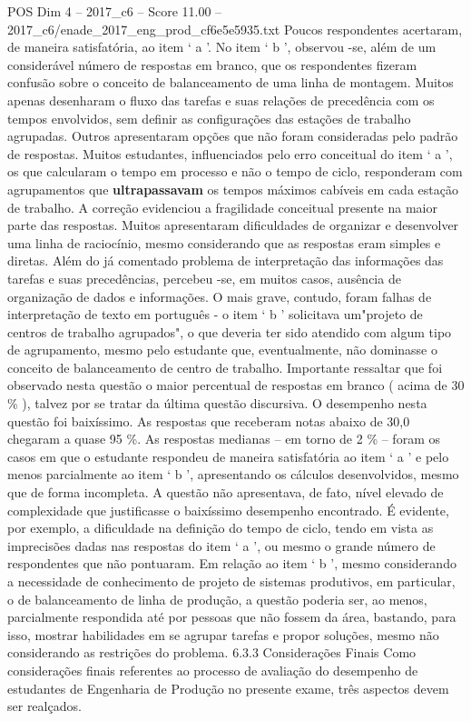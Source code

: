 \begin{textsample}{POS Dim 4 – 2017\_c6 – Score 11.00 – 2017\_c6/enade\_2017\_eng\_prod\_cf6e5e5935.txt}
Poucos respondentes acertaram, de maneira satisfatória, ao item ‘ a ’.
No item ‘ b ’, observou -se, além de um considerável número de respostas em branco, que os respondentes fizeram confusão sobre o conceito de balanceamento de uma linha de montagem.
Muitos apenas desenharam o fluxo das tarefas e suas relações de precedência com os tempos envolvidos, sem definir as configurações das estações de trabalho agrupadas.
Outros apresentaram opções que não foram consideradas pelo padrão de respostas.
Muitos estudantes, influenciados pelo erro conceitual do item ‘ a ’, os que calcularam o tempo em processo e não o tempo de ciclo, responderam com agrupamentos que \textbf{ultrapassavam} os tempos máximos cabíveis em cada estação de trabalho.
A correção evidenciou a fragilidade conceitual presente na maior parte das respostas.
Muitos apresentaram dificuldades de organizar e desenvolver uma linha de raciocínio, mesmo considerando que as respostas eram simples e diretas.
Além do já comentado problema de interpretação das informações das tarefas e suas precedências, percebeu -se, em muitos casos, ausência de organização de dados e informações.
O mais grave, contudo, foram falhas de interpretação de texto em português - o item ‘ b ’ solicitava um"projeto de centros de trabalho agrupados", o que deveria ter sido atendido com algum tipo de agrupamento, mesmo pelo estudante que, eventualmente, não dominasse o conceito de balanceamento de centro de trabalho.
Importante ressaltar que foi observado nesta questão o maior percentual de respostas em branco ( acima de 30 \% ), talvez por se tratar da última questão discursiva.
O desempenho nesta questão foi baixíssimo.
As respostas que receberam notas abaixo de 30,0 chegaram a quase 95 \%.
As respostas medianas – em torno de 2 \% – foram os casos em que o estudante respondeu de maneira satisfatória ao item ‘ a ’ e pelo menos parcialmente ao item ‘ b ’, apresentando os cálculos desenvolvidos, mesmo que de forma incompleta.
A questão não apresentava, de fato, nível elevado de complexidade que justificasse o baixíssimo desempenho encontrado.
É evidente, por exemplo, a dificuldade na definição do tempo de ciclo, tendo em vista as imprecisões dadas nas respostas do item ‘ a ’, ou mesmo o grande número de respondentes que não pontuaram.
Em relação ao item ‘ b ’, mesmo considerando a necessidade de conhecimento de projeto de sistemas produtivos, em particular, o de balanceamento de linha de produção, a questão poderia ser, ao menos, parcialmente respondida até por pessoas que não fossem da área, bastando, para isso, mostrar habilidades em se agrupar tarefas e propor soluções, mesmo não considerando as restrições do problema. 6.3.3 Considerações Finais Como considerações finais referentes ao processo de avaliação do desempenho de estudantes de Engenharia de Produção no presente exame, três aspectos devem ser realçados.

\end{textsample}
